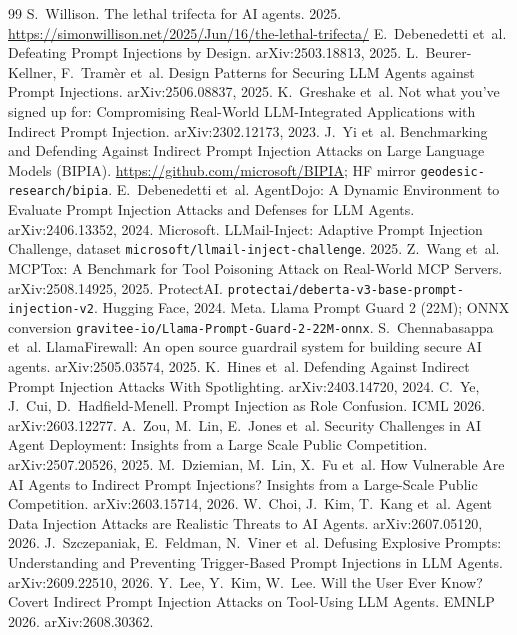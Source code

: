 \begin{thebibliography}{99}
 S.~Willison. The lethal trifecta for AI agents. 2025. \url{https://simonwillison.net/2025/Jun/16/the-lethal-trifecta/}
 E.~Debenedetti et~al. Defeating Prompt Injections by Design. arXiv:2503.18813, 2025.
 L.~Beurer-Kellner, F.~Tram\`er et~al. Design Patterns for Securing LLM Agents against Prompt Injections. arXiv:2506.08837, 2025.
 K.~Greshake et~al. Not what you've signed up for: Compromising Real-World LLM-Integrated Applications with Indirect Prompt Injection. arXiv:2302.12173, 2023.
 J.~Yi et~al. Benchmarking and Defending Against Indirect Prompt Injection Attacks on Large Language Models (BIPIA). \url{https://github.com/microsoft/BIPIA}; HF mirror \texttt{geodesic-research/bipia}.
 E.~Debenedetti et~al. AgentDojo: A Dynamic Environment to Evaluate Prompt Injection Attacks and Defenses for LLM Agents. arXiv:2406.13352, 2024.
 Microsoft. LLMail-Inject: Adaptive Prompt Injection Challenge, dataset \texttt{microsoft/llmail-inject-challenge}. 2025.
 Z.~Wang et~al. MCPTox: A Benchmark for Tool Poisoning Attack on Real-World MCP Servers. arXiv:2508.14925, 2025.
 ProtectAI. \texttt{protectai/deberta-v3-base-prompt-injection-v2}. Hugging Face, 2024.
 Meta. Llama Prompt Guard 2 (22M); ONNX conversion \texttt{gravitee-io/Llama-Prompt-Guard-2-22M-onnx}.
 S.~Chennabasappa et~al. LlamaFirewall: An open source guardrail system for building secure AI agents. arXiv:2505.03574, 2025.
 K.~Hines et~al. Defending Against Indirect Prompt Injection Attacks With Spotlighting. arXiv:2403.14720, 2024.
 C.~Ye, J.~Cui, D.~Hadfield-Menell. Prompt Injection as Role Confusion. ICML 2026. arXiv:2603.12277.
 A.~Zou, M.~Lin, E.~Jones et~al. Security Challenges in AI Agent Deployment: Insights from a Large Scale Public Competition. arXiv:2507.20526, 2025.
 M.~Dziemian, M.~Lin, X.~Fu et~al. How Vulnerable Are AI Agents to Indirect Prompt Injections? Insights from a Large-Scale Public Competition. arXiv:2603.15714, 2026.
 W.~Choi, J.~Kim, T.~Kang et~al. Agent Data Injection Attacks are Realistic Threats to AI Agents. arXiv:2607.05120, 2026.
 J.~Szczepaniak, E.~Feldman, N.~Viner et~al. Defusing Explosive Prompts: Understanding and Preventing Trigger-Based Prompt Injections in LLM Agents. arXiv:2609.22510, 2026.
 Y.~Lee, Y.~Kim, W.~Lee. Will the User Ever Know? Covert Indirect Prompt Injection Attacks on Tool-Using LLM Agents. EMNLP 2026. arXiv:2608.30362.

\end{thebibliography}
